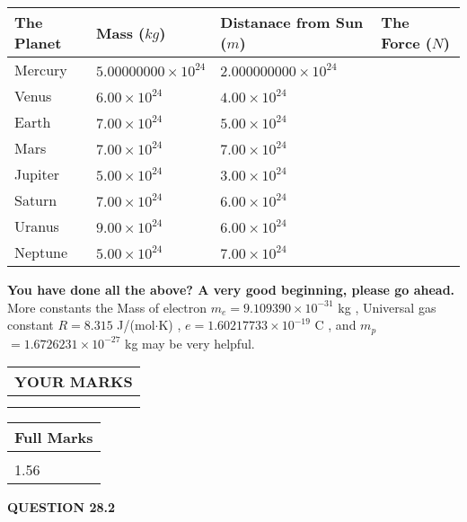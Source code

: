 \documentclass[12pt]{article}
\begin{document}
 
\begin{tabular}{|l|l|l|l|}
\hline
The Planet & Mass ($kg$) & Distanace from Sun ($m$) & The Force ($N$)\\
\hline
Mercury  &
           $ %
5.00000000 \times 10^{24} $   &
             $ %
2.000000000 \times 10^{24} $    &
\\  \hline
Venus    &
           $ %
6.00 \times 10^{24} $    &
             $ %
4.00 \times 10^{24} $    &
\\  \hline
Earth    &
           $ %
7.00 \times 10^{24} $    &
             $ %
5.00 \times 10^{24} $    &
\\   \hline
Mars     &
           $ %
7.00 \times 10^{24} $    &
             $ %
7.00 \times 10^{24} $    &
\\   \hline
Jupiter  &
           $ %
5.00 \times 10^{24} $    &
             $ %
3.00 \times 10^{24} $    &
\\  \hline
Saturn   &
           $ %
7.00 \times 10^{24}$    &
             $ %
6.00 \times 10^{24}$    &
\\  \hline
Uranus   &
           $ %
9.00 \times 10^{24} $    &
             $ %
6.00 \times 10^{24} $    &
\\  \hline
Neptune  &
           $ %
5.00 \times 10^{24} $    &
             $ %
7.00 \times 10^{24} $    &
\\  \hline
 
\end{tabular}
 
 

 
 

 
\vspace{0.3in}
   
   
\vspace{0.3in}
{\textbf{\LARGE{You have done all the above? A very good beginning, please go ahead.}}}
More constants the
Mass of electron
$m_e$$ =
9.109390 \times 10^{-31} $
kg
,
Universal gas constant
$R$$ =
8.315 $
J/(mol$\cdot $K)
,
$e$$ =
1.60217733 \times 10^{-19} $
C
, and
$m_p$$ =
1.6726231 \times 10^{-27} $
kg
%
may be very helpful.
\vspace{0.3in}
   
   
  
\vspace{0.2in}
  
\noindent\begin{tabular}{|l|}
\hline
 YOUR MARKS  \\
\hline
 \\ 
 \\ 
\hline
\end{tabular}
\hspace{0.05in} \begin{tabular}{|l|}
\hline
 Full Marks  \\
\hline
 \\ 
1.56 \\
\hline
\end{tabular}
{\textbf{\Large{QUESTION
28.2 
}}}
  
\end{document}
